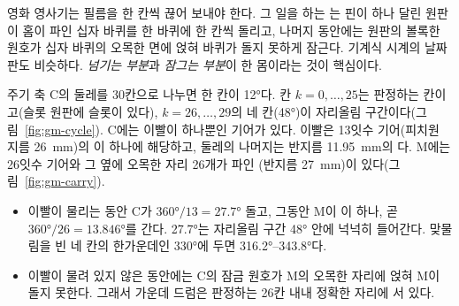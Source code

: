 \General 영화 영사기는 필름을 한 칸씩 끊어 보내야 한다. 그 일을 하는 는 핀이 하나
달린 원판이 홈이 파인 십자 바퀴를 한 바퀴에 한 칸씩 돌리고, 나머지 동안에는 원판의 볼록한 원호가 십자 바퀴의
오목한 면에 얹혀 바퀴가 돌지 못하게 잠근다. 기계식 시계의 날짜판도 비슷하다. \emph{넘기는 부분}과 \emph{잠그는
부분}이 한 몸이라는 것이 핵심이다.

\Ours 주기 축 C의 둘레를 30칸으로 나누면 한 칸이 12°다. 칸 $k = 0, \ldots, 25$는 판정하는 칸이고(슬롯 원판에 슬롯이
있다), $k = 26, \ldots, 29$의 네 칸(48°)이 자리올림 구간이다(그림~\ref{fig:gm-cycle}). C에는 이빨이 하나뿐인 기어가
있다. 이빨은 13잇수 기어(피치원 지름 26~mm)의 이 하나에 해당하고, 둘레의 나머지는 반지름 11.95~mm의 다. M에는 26잇수 기어와 그 옆에 오목한 자리 26개가 파인 (반지름 27~mm)이
있다(그림~\ref{fig:gm-carry}).

\begin{itemize}
\item 이빨이 물리는 동안 C가 $360°/13 = 27.7°$ 돌고, 그동안 M이 이 하나, 곧 $360°/26 = 13.846°$를 간다. 27.7°는
자리올림 구간 48° 안에 넉넉히 들어간다. 맞물림을 빈 네 칸의 한가운데인 330°에 두면 316.2°--343.8°다.
\item 이빨이 물려 있지 않은 동안에는 C의 잠금 원호가 M의 오목한 자리에 얹혀 M이 돌지 못한다. 그래서 가운데 드럼은
판정하는 26칸 내내 정확한 자리에 서 있다.
\end{itemize}

